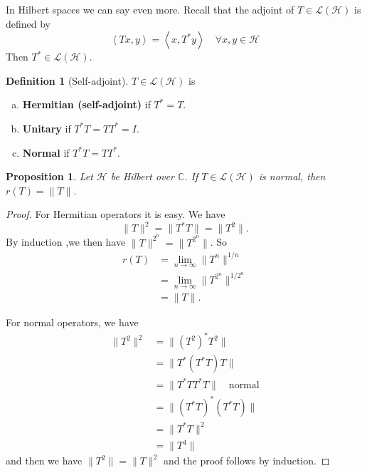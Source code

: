 \documentclass[justified]{tufte-book}
\theoremstyle{plain}%
\newtheorem{prop}[thm]{Proposition}
\theoremstyle{definition}
\newtheorem{defn}[thm]{Definition}
\theoremstyle{remark}
\renewcommand{\C}{\mathbb{C}}
\newcommand{\iprod}[1]{\left\langle #1 \right\rangle}
\begin{document}
In Hilbert spaces we can say even more.  Recall that the adjoint of $T \in \mathcal L(\mathcal H)$ is defined by \[
  \iprod{Tx, y} = \iprod{x, T^* y} \quad \forall x, y \in \mathcal H
\]  Then $T^* \in \mathcal L(\mathcal H)$.  
\begin{defn}[Self-adjoint]
$T \in \mathcal L(\mathcal H)$ is
 \begin{enumerate}[(a)]
  \item \textbf{Hermitian (self-adjoint)} if $T^* = T$.
  \item \textbf{Unitary} if $T^* T = T T^* = I$.  
  \item \textbf{Normal} if $T^* T = T T^*$.  
\end{enumerate}
\end{defn}



\begin{prop}
  Let $\mathcal H$ be Hilbert over $\C$.  If $T \in \mathcal L(\mathcal H)$ is normal, then $r(T) = \| T \|$.  
\end{prop}

\begin{proof}
  For Hermitian operators it is easy.  We have \[
      \| T \|^2 = \| T^* T \| = \| T^2 \|.
  \]  By induction ,we then have $\| T \|^{2^n} = \| T^{2^n} \|$.  So \begin{align*}
      r(T) &= \lim_{n \rightarrow \infty} \| T^n \|^{1/n} \\
          &= \lim_{n \rightarrow \infty} \| T^{2^n} \|^{1/{2^n}} \\
          &= \| T \|.
  \end{align*}  
  
  For normal operators, we have \begin{align*}
      \| T^2 \|^2 &= \| (T^2)^* T^2 \| \\
                  &= \| T^*(T^* T) T \| \\
                  &= \| T^* T T^* T \| \quad \text{normal} \\
                  &= \| (T^* T)^* (T^* T) \|  \\
                  &= \| T^* T \|^2 \\
                  &= \| T^4 \|   
  \end{align*} and then we have $\| T^2 \| = \| T \|^2$ and the proof follows by induction.
\end{proof}
\end{document}
